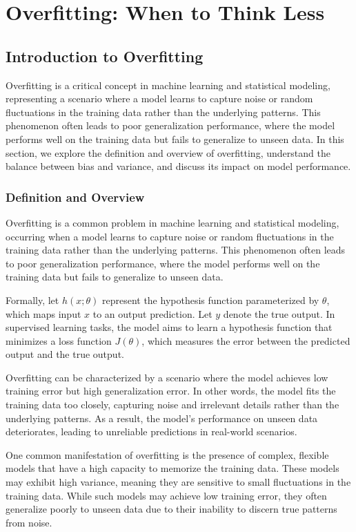 \documentclass[12pt]{book} %
\begin{document}
\chapter{Overfitting: When to Think Less}

\section{Introduction to Overfitting}

Overfitting is a critical concept in machine learning and statistical modeling, representing a scenario where a model learns to capture noise or random fluctuations in the training data rather than the underlying patterns. This phenomenon often leads to poor generalization performance, where the model performs well on the training data but fails to generalize to unseen data. In this section, we explore the definition and overview of overfitting, understand the balance between bias and variance, and discuss its impact on model performance.

\subsection{Definition and Overview}

Overfitting is a common problem in machine learning and statistical modeling, occurring when a model learns to capture noise or random fluctuations in the training data rather than the underlying patterns. This phenomenon often leads to poor generalization performance, where the model performs well on the training data but fails to generalize to unseen data.

Formally, let \(h(x; \theta)\) represent the hypothesis function parameterized by \(\theta\), which maps input \(x\) to an output prediction. Let \(y\) denote the true output. In supervised learning tasks, the model aims to learn a hypothesis function that minimizes a loss function \(J(\theta)\), which measures the error between the predicted output and the true output.

Overfitting can be characterized by a scenario where the model achieves low training error but high generalization error. In other words, the model fits the training data too closely, capturing noise and irrelevant details rather than the underlying patterns. As a result, the model's performance on unseen data deteriorates, leading to unreliable predictions in real-world scenarios.

One common manifestation of overfitting is the presence of complex, flexible models that have a high capacity to memorize the training data. These models may exhibit high variance, meaning they are sensitive to small fluctuations in the training data. While such models may achieve low training error, they often generalize poorly to unseen data due to their inability to discern true patterns from noise.
\end{document}
